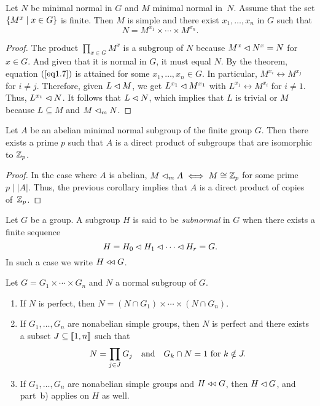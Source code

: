 \begin{cor}\label{minimal-normal-of-minimal-normal}
    Let\/ $N$ be minimal normal in\/ $G$ and\/ $M$ minimal normal in\/~$N$. Assume that the set\/ $\{M^x \mid x \in G\}$ is finite. Then\/ $M$ is simple and there exist\/ $x_1, \dots, x_n$ in\/ $G$ such that
    \begin{equation}\label{eq1.7}
        N = M^{x_1} \times \cdots \times M^{x_n}.
    \end{equation}
\end{cor}

\begin{proof} The product $\prod_{x\in G}M^x$ is a subgroup of $N$ because $M^x\lhd N^x=N$ for $x\in G$. And given that it is normal in $G$, it must equal $N$. By the theorem, equation $(\ref{eq1.7})$ is attained for some $x_1,\dots,x_n\in G$. In particular, $M^{x_i}\leftrightarrow M^{x_j}$ for $i\ne j$. Therefore, given $L\lhd M$, we get $L^{x_1}\lhd M^{x_1}$ with $L^{x_1}\leftrightarrow M^{x_i}$ for $i\ne 1$. Thus, $L^{x_1}\lhd N$. It follows that $L\lhd N$, which implies that $L$ is trivial or $M$ because $L\subseteq M$ and $M\lhd_mN$.  \end{proof}

\begin{cor}\label{abelian-minimal-normal-is-elementary}
    Let\/ $A$ be an abelian minimal normal subgroup of the finite group\/ $G$. Then there exists a prime\/ $p$ such that\/ $A$ is a direct product of subgroups that are isomorphic to\/ $\mathbb{Z}_p$.
\end{cor}

\begin{proof} In the case where $A$ is abelian, $M\lhd_mA\iff M\cong\mathbb{Z}_p$ for some prime $p\mid|A|$. Thus, the previous corollary implies that $A$ is a direct product of copies of~$\mathbb{Z}_p$.  \end{proof}

\begin{defn}
    Let\/ $G$ be a group. A subgroup\/ $H$ is said to be \textsl{subnormal} in\/ $G$ when there exists a finite sequence
    $$
        H = H_0 \lhd H_1 \lhd \cdots \lhd H_r = G.
    $$
    In such a case we write $H\mathrel{\triangleleft\triangleleft} G$.
\end{defn}

\begin{thm}\label{semisimple-normal}
    Let\/ $G = G_1 \times \cdots \times G_n$ and\/ $N$ a normal subgroup of\/ $G$.
    \begin{enumerate}[\rm a)]
    \item If\/ $N$ is perfect, then\/ $N = (N \cap G_1) \times \cdots \times (N \cap G_n)$.
    \item If\/ $G_1, \dots, G_n$ are nonabelian simple groups, then\/ $N$ is perfect and there exists a subset\/ $J \subseteq \llbracket1,n\rrbracket$ such that
    $$
        N = \prod_{j \in J} G_j\quad\text{\rm and}\quad G_k \cap N = 1\text{\rm\ for }k \notin J.
    $$
    \item If\/ $G_1, \dots, G_n$ are nonabelian simple groups and\/ $H\mathrel{\triangleleft\triangleleft} G$, then\/ $H\lhd G$, and part\/~{\rm b)} applies on\/ $H$ as well.
    \end{enumerate}
\end{thm}

